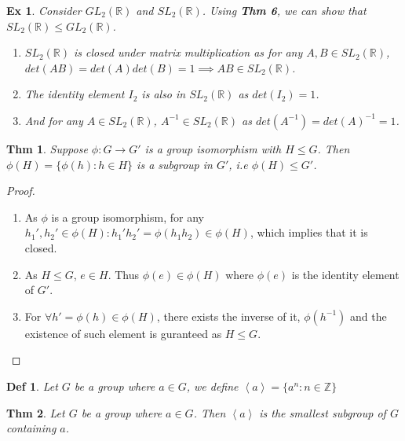 \documentclass[paper=a4, fontsize=11pt]{scrartcl}
\newcommand{\cyc}[1]{\left< #1 \right>}
\newcommand{\nextline}{$ $ \newline \vspace{-0.15in}}
\newtheorem{theorem}{Thm}
\newtheorem{definition}{Def}
\newtheorem{example}{Ex}
\begin{document}
\begin{example}
	Consider $GL_2 (\mathbb{R})$ and $SL_2(\mathbb{R})$. Using \textbf{Thm 6}, we can show that $SL_2(\mathbb{R}) \leqslant GL_2(\mathbb{R})$.
	\begin{enumerate}
		\item $SL_2(\mathbb{R})$ is closed under matrix multiplication as for any $A,B \in SL_2(\mathbb{R})$,  $det(AB)=det(A)det(B)=1 \implies AB \in SL_2(\mathbb{R})$.
		\item The identity element $I_2$ is also in $SL_2(\mathbb{R})$ as $det(I_2)=1$.
		\item And for any $A \in SL_2(\mathbb{R})$, $A^{-1} \in SL_2(\mathbb{R})$ as $det(A^{-1})=det(A)^{-1}=1$.\\
	\end{enumerate}
\end{example}

\begin{theorem}
	Suppose $\phi : G \to G'$ is a group isomorphism with $H \leqslant G$. Then $\phi(H)=\{\phi(h) : h\in H \}$ is a subgroup in $G'$, i.e $\phi(H) \leqslant G'$.\\
\end{theorem}

\begin{proof}
\nextline
\begin{enumerate}
	\item As $\phi$ is a group isomorphism, for any $h_1' ,h_2' \in \phi(H) : h_1'h_2' = \phi(h_1h_2)\in \phi(H) $, which implies that it is closed.
	\item As $H \leqslant G$, $e \in H$. Thus $\phi(e) \in \phi(H)$ where $\phi(e)$ is the identity element of $G'$.
	\item For $\forall h'=\phi(h) \in \phi(H)$, there exists the inverse of it, $\phi(h^{-1})$ and the existence of such element is guranteed as $H\leqslant G$. 
\end{enumerate}
\end{proof}

\begin{definition}
	Let $G$ be a group where $a\in G$, we define $\cyc{a}=\{a^n : n \in \mathbb{Z} \}$\\
\end{definition}

\begin{theorem}
	Let $G$ be a group where $a\in G$. Then $\cyc{a}$ is the smallest subgroup of $G$ containing $a$.\\
\end{theorem}
\end{document}
